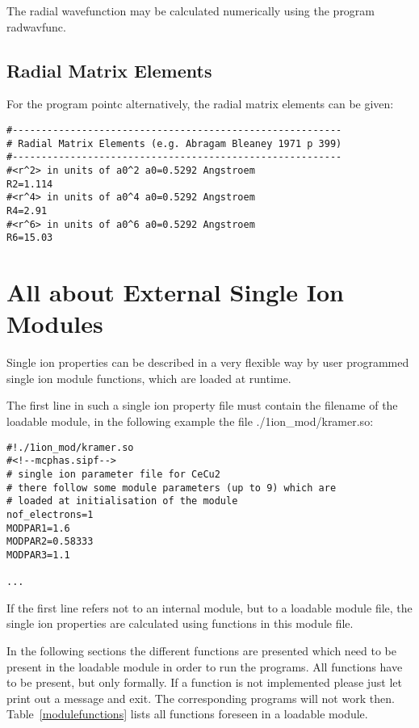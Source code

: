 The radial wavefunction may be calculated numerically using the program {\prg radwavfunc}.

\subsection{Radial Matrix Elements}

For the program {\prg pointc} alternatively, the radial matrix elements can be given:
{\footnotesize
\begin{verbatim}
#---------------------------------------------------------
# Radial Matrix Elements (e.g. Abragam Bleaney 1971 p 399)
#---------------------------------------------------------
#<r^2> in units of a0^2 a0=0.5292 Angstroem
R2=1.114
#<r^4> in units of a0^4 a0=0.5292 Angstroem
R4=2.91
#<r^6> in units of a0^6 a0=0.5292 Angstroem
R6=15.03
\end{verbatim}
}



\section{All about External Single Ion Modules}\label{extsimod}

Single ion properties can be described in a very flexible way by
user programmed single ion module functions, which are loaded at runtime.

The first line in such a single ion property file
must contain the filename of the loadable module, in the following example
the file {\prg ./1ion\_mod/kramer.so}:

\begin{verbatim}
#!./1ion_mod/kramer.so
#<!--mcphas.sipf-->
# single ion parameter file for CeCu2
# there follow some module parameters (up to 9) which are 
# loaded at initialisation of the module
nof_electrons=1
MODPAR1=1.6
MODPAR2=0.58333
MODPAR3=1.1

...
\end{verbatim}


If the first line refers not to an internal module, but to
 a loadable module file, the single ion
properties are calculated using functions in this module file.

In the following sections the different functions are presented
which need to be present in the loadable module in order to 
run the programs. All functions have to be present, but only 
formally. If a function is not implemented please just let
print out a message and exit. The corresponding programs
will not work then. Table~\ref{modulefunctions} lists all
functions foreseen in a loadable module.

